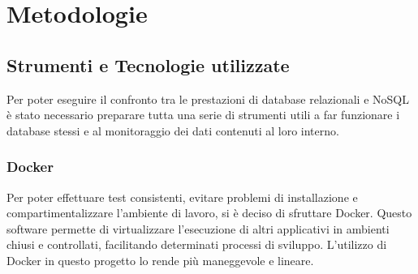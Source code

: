 
\chapter{Metodologie}
\label{cap:metodologie}


\section{Strumenti e Tecnologie utilizzate}
Per poter eseguire il confronto tra le prestazioni di database relazionali e NoSQL è stato necessario preparare tutta una serie di strumenti utili a far funzionare i database stessi e al monitoraggio dei dati contenuti al loro interno.

\subsection{Docker}
Per poter effettuare test consistenti, evitare problemi di installazione e compartimentalizzare l'ambiente di lavoro, si è deciso di sfruttare Docker. Questo software permette di virtualizzare l'esecuzione di altri applicativi in ambienti chiusi e controllati, facilitando determinati processi di sviluppo. L'utilizzo di Docker in questo progetto lo rende più maneggevole e lineare.\\


